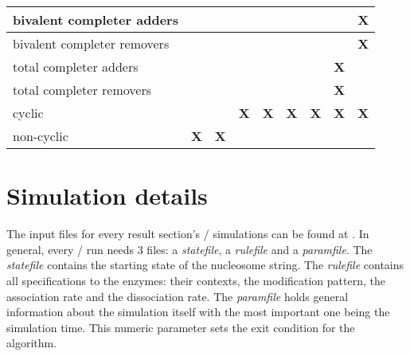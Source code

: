 \begin{table}
\begin{tabular}{l|c|c|c|c|c|c|c|c|}
                bivalent completer adders   &                      &                      &                      &                      &                      &                     &            & \textbf{X}  \\\hline
                bivalent completer removers &                      &                      &                      &                      &                      &                     &            & \textbf{X}  \\\hline
                total completer adders      &                      &                      &                      &                      &                      &                     & \textbf{X} &             \\\hline
                total completer removers    &                      &                      &                      &                      &                      &                     & \textbf{X} &             \\\hline
                cyclic                      &                      &                      & \textbf{X}           & \textbf{X}           & \textbf{X}           & \textbf{X}          & \textbf{X} & \textbf{X}  \\\hline
                non-cyclic                  & \textbf{X}           & \textbf{X}           &                      &                      &                      &                     &            & \\\hline
                \end{tabular}
                \label{tab:EnzymeRuleSets}
            \end{table}
    \section{Simulation details}
    \label{sec:simulationDetails}
        The input files for every result section's \ed/ simulations can be found at \source. In general, every \ed/ run needs 3 files: a \textit{statefile}, a \textit{rulefile} and a \textit{paramfile}. The \textit{statefile} contains the starting state of the nucleosome string. The \textit{rulefile} contains all specifications to the enzymes: their contexts, the modification pattern, the association rate and the dissociation rate. The \textit{paramfile} holds general information about the simulation itself with the most important one being the simulation time. This numeric parameter sets the exit condition for the algorithm.


